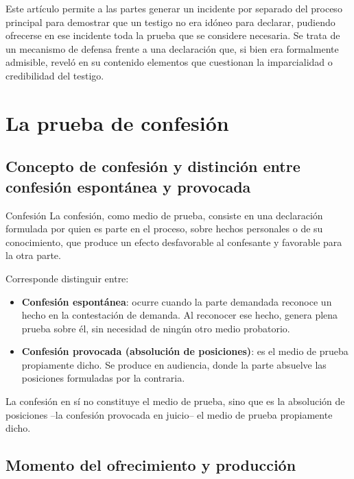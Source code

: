 \documentclass[12pt,oneside]{book}
\begin{document}
Este artículo permite a las partes generar un incidente por separado del proceso principal para demostrar que un testigo no era idóneo para declarar, pudiendo ofrecerse en ese incidente toda la prueba que se considere necesaria. Se trata de un mecanismo de defensa frente a una declaración que, si bien era formalmente admisible, reveló en su contenido elementos que cuestionan la imparcialidad o credibilidad del testigo.

\chapter{La prueba de confesión}

\section{Concepto de confesión y distinción entre confesión espontánea y provocada}

\begin{definition}{Confesión}
La confesión, como medio de prueba, consiste en una declaración formulada por quien es parte en el proceso, sobre hechos personales o de su conocimiento, que produce un efecto desfavorable al confesante y favorable para la otra parte.
\end{definition}

Corresponde distinguir entre:

\begin{itemize}
    \item \textbf{Confesión espontánea}: ocurre cuando la parte demandada reconoce un hecho en la contestación de demanda. Al reconocer ese hecho, genera plena prueba sobre él, sin necesidad de ningún otro medio probatorio.
    \item \textbf{Confesión provocada (absolución de posiciones)}: es el medio de prueba propiamente dicho. Se produce en audiencia, donde la parte absuelve las posiciones formuladas por la contraria.
\end{itemize}

La confesión en sí no constituye el medio de prueba, sino que es la absolución de posiciones --la confesión provocada en juicio-- el medio de prueba propiamente dicho.

\section{Momento del ofrecimiento y producción}
\end{document}

